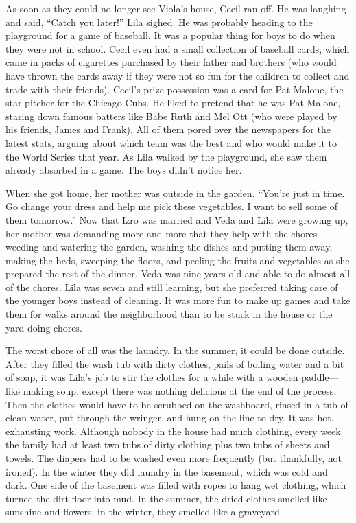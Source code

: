 \documentclass[
  american,
  letterpaper,
]{book}
\begin{document}
As soon as they could no longer see Viola's house, Cecil ran off. He was
laughing and said, ``Catch you later!'' Lila sighed. He was probably
heading to the playground for a game of baseball. It was a popular thing
for boys to do when they were not in school. Cecil even had a small
collection of baseball cards, which came in packs of cigarettes
purchased by their father and brothers (who would have thrown the cards
away if they were not so fun for the children to collect and trade with
their friends). Cecil's prize possession was a card for Pat Malone, the
star pitcher for the Chicago Cubs. He liked to pretend that he was Pat
Malone, staring down famous batters like Babe Ruth and Mel Ott (who were
played by his friends, James and Frank). All of them pored over the
newspapers for the latest stats, arguing about which team was the best
and who would make it to the World Series that year. As Lila walked by
the playground, she saw them already absorbed in a game. The boys didn't
notice her.

When she got home, her mother was outside in the garden. ``You're just
in time. Go change your dress and help me pick these vegetables. I want
to sell some of them tomorrow.'' Now that Izro was married and Veda and
Lila were growing up, her mother was demanding more and more that they
help with the chores---weeding and watering the garden, washing the
dishes and putting them away, making the beds, sweeping the floors, and
peeling the fruits and vegetables as she prepared the rest of the
dinner. Veda was nine years old and able to do almost all of the chores.
Lila was seven and still learning, but she preferred taking care of the
younger boys instead of cleaning. It was more fun to make up games and
take them for walks around the neighborhood than to be stuck in the
house or the yard doing chores.

The worst chore of all was the laundry. In the summer, it could be done
outside. After they filled the wash tub with dirty clothes, pails of
boiling water and a bit of soap, it was Lila's job to stir the clothes
for a while with a wooden paddle---like making soup, except there was
nothing delicious at the end of the process. Then the clothes would have
to be scrubbed on the washboard, rinsed in a tub of clean water, put
through the wringer, and hung on the line to dry. It was hot, exhausting
work. Although nobody in the house had much clothing, every week the
family had at least two tubs of dirty clothing plus two tubs of sheets
and towels. The diapers had to be washed even more frequently (but
thankfully, not ironed). In the winter they did laundry in the basement,
which was cold and dark. One side of the basement was filled with ropes
to hang wet clothing, which turned the dirt floor into mud. In the
summer, the dried clothes smelled like sunshine and flowers; in the
winter, they smelled like a graveyard.
\end{document}
